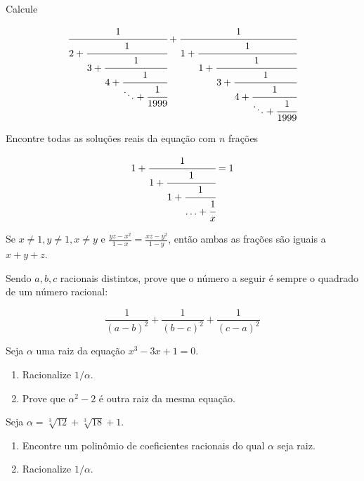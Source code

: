 \begin{questao}
  Calcule

  $$ \cfrac{1}{2+\cfrac{1}{3+\cfrac{1}{4+\cfrac{1}{\ddots+\cfrac{1}{1999}}}}} +
  \cfrac{1}{1+\cfrac{1}{1+\cfrac{1}{3+\cfrac{1}{4+\cfrac{1}{\ddots+\cfrac{1}{1999}}}}}} $$
\end{questao}

\begin{questao}
  Encontre todas as soluções reais da equação com $n$ frações

  $$ 1+\cfrac{1}{1+\cfrac{1}{1+\cfrac{1}{\ldots+\cfrac{1}{x}}}} = 1 $$
\end{questao}

\begin{questao}
  Se $x \not = 1, y \not = 1, x \not = y$ e $\frac{yz-x^2}{1-x} =
  \frac{xz-y^2}{1-y}$, então ambas as frações são iguais a $x+y+z$.
\end{questao}

\begin{questao}
  Sendo $a,b,c$ racionais distintos, prove que o número a seguir é sempre o
  quadrado de um número racional:

  $$ {\frac{1}{(a-b)^2} + \frac{1}{(b-c)^2} + \frac{1}{(c-a)^2}} $$
\end{questao}

\begin{questao}
  Seja $\alpha$ uma raiz da equação $x^3-3x+1 = 0$.

  \begin{enumerate}

  \item Racionalize $1/\alpha$.

  \item Prove que $\alpha^2-2$ é outra raiz da mesma equação.

  \end{enumerate}

\end{questao}

\begin{questao}
  Seja $\alpha = \sqrt[3]{12} + \sqrt[3]{18} + 1$.

  \begin{enumerate}

  \item Encontre um polinômio de coeficientes racionais do qual $\alpha$ seja
    raiz.

  \item Racionalize $1/\alpha$.
  \end{enumerate}

\end{questao}

